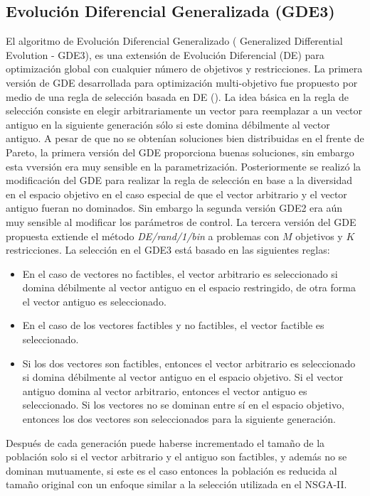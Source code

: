 \subsection{Evolución Diferencial Generalizada (GDE3)}
El algoritmo de Evolución Diferencial Generalizado ( Generalized Differential Evolution - GDE3), es una extensión de Evolución Diferencial (DE) para optimización global con cualquier número de objetivos y restricciones.
%
La primera versión de GDE desarrollada para optimización multi-objetivo fue propuesto por medio de una regla de selección basada en DE (\cite{Joel:SelectionRuleLampinen}).
%
La idea básica en la regla de selección consiste en elegir arbitrariamente un vector para reemplazar a un vector antiguo  en la siguiente generación sólo si este domina débilmente al vector antiguo.
%
A pesar de que no se obtenían soluciones bien distribuidas en el frente de Pareto, la primera versión del GDE proporciona buenas soluciones, sin embargo esta vversión era muy sensible en la parametrización.
%
Posteriormente se realizó la modificación del GDE para realizar la regla de selección en base a la diversidad en el espacio objetivo en el caso especial de que el vector arbitrario y el vector antiguo fueran no dominados.
%
Sin embargo la segunda versión GDE2 era aún muy sensible al modificar los parámetros de control.
%
La tercera versión del GDE propuesta extiende el método \textit{DE/rand/1/bin} a problemas con $M$ objetivos y $K$ restricciones.
%
La selección en el GDE3 está basado en las siguientes reglas:
\begin{itemize}
\item En el caso de vectores no factibles, el vector arbitrario es seleccionado si domina débilmente al vector antiguo en el espacio restringido, de otra forma el vector antiguo es seleccionado.
\item En el caso de los vectores factibles y no factibles, el vector factible es seleccionado.
\item Si los dos vectores son factibles, entonces el vector arbitrario es seleccionado si domina débilmente al vector antiguo en el espacio objetivo. Si el vector antiguo domina al vector arbitrario, entonces el vector antiguo es seleccionado. Si los vectores no se dominan entre sí en el espacio objetivo, entonces los dos vectores son seleccionados para la siguiente generación.
\end{itemize}
Después de cada generación puede haberse incrementado el tamaño de la población solo si el vector arbitrario y el antiguo son factibles, y además no se dominan mutuamente, si este es el caso entonces la población es reducida al tamaño original con un enfoque similar a la selección utilizada en el NSGA-II.


